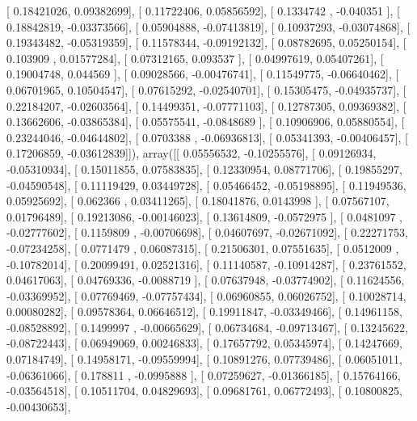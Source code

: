 \documentclass{article}
\begin{document}
       [ 0.18421026,  0.09382699],
       [ 0.11722406,  0.05856592],
       [ 0.1334742 , -0.040351  ],
       [ 0.18842819, -0.03373566],
       [ 0.05904888, -0.07413819],
       [ 0.10937293, -0.03074868],
       [ 0.19343482, -0.05319359],
       [ 0.11578344, -0.09192132],
       [ 0.08782695,  0.05250154],
       [ 0.103909  ,  0.01577284],
       [ 0.07312165,  0.093537  ],
       [ 0.04997619,  0.05407261],
       [ 0.19004748,  0.044569  ],
       [ 0.09028566, -0.00476741],
       [ 0.11549775, -0.06640462],
       [ 0.06701965,  0.10504547],
       [ 0.07615292, -0.02540701],
       [ 0.15305475, -0.04935737],
       [ 0.22184207, -0.02603564],
       [ 0.14499351, -0.07771103],
       [ 0.12787305,  0.09369382],
       [ 0.13662606, -0.03865384],
       [ 0.05575541, -0.0848689 ],
       [ 0.10906906,  0.05880554],
       [ 0.23244046, -0.04644802],
       [ 0.0703388 , -0.06936813],
       [ 0.05341393, -0.00406457],
       [ 0.17206859, -0.03612839]]), array([[ 0.05556532, -0.10255576],
       [ 0.09126934, -0.05310934],
       [ 0.15011855,  0.07583835],
       [ 0.12330954,  0.08771706],
       [ 0.19855297, -0.04590548],
       [ 0.11119429,  0.03449728],
       [ 0.05466452, -0.05198895],
       [ 0.11949536,  0.05925692],
       [ 0.062366  ,  0.03411265],
       [ 0.18041876,  0.0143998 ],
       [ 0.07567107,  0.01796489],
       [ 0.19213086, -0.00146023],
       [ 0.13614809, -0.0572975 ],
       [ 0.0481097 , -0.02777602],
       [ 0.1159809 , -0.00706698],
       [ 0.04607697, -0.02671092],
       [ 0.22271753, -0.07234258],
       [ 0.0771479 ,  0.06087315],
       [ 0.21506301,  0.07551635],
       [ 0.0512009 , -0.10782014],
       [ 0.20099491,  0.02521316],
       [ 0.11140587, -0.10914287],
       [ 0.23761552,  0.04617063],
       [ 0.04769336, -0.0088719 ],
       [ 0.07637948, -0.03774902],
       [ 0.11624556, -0.03369952],
       [ 0.07769469, -0.07757434],
       [ 0.06960855,  0.06026752],
       [ 0.10028714,  0.00080282],
       [ 0.09578364,  0.06646512],
       [ 0.19911847, -0.03349466],
       [ 0.14961158, -0.08528892],
       [ 0.1499997 , -0.00665629],
       [ 0.06734684, -0.09713467],
       [ 0.13245622, -0.08722443],
       [ 0.06949069,  0.00246833],
       [ 0.17657792,  0.05345974],
       [ 0.14247669,  0.07184749],
       [ 0.14958171, -0.09559994],
       [ 0.10891276,  0.07739486],
       [ 0.06051011, -0.06361066],
       [ 0.178811  , -0.0995888 ],
       [ 0.07259627, -0.01366185],
       [ 0.15764166, -0.03564518],
       [ 0.10511704,  0.04829693],
       [ 0.09681761,  0.06772493],
       [ 0.10800825, -0.00430653],
\end{document}
